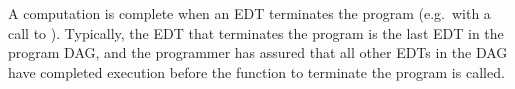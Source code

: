 %

A computation is complete when an EDT terminates the program
(e.g.\ with a call to ). Typically, the EDT that
terminates the program is the last EDT in the program DAG, and the
programmer has assured that all other EDTs in the DAG have completed
execution before the function to terminate the program is called.


